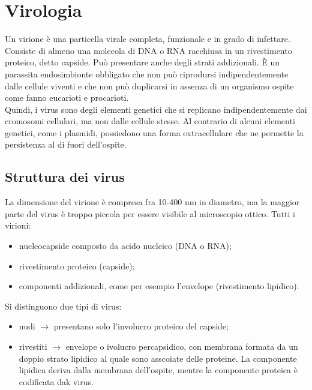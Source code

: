 \chapter{Virologia}
Un virione \`e una particella virale completa, funzionale e in grado di infettare. Consiste di almeno una molecola di DNA o RNA racchiusa in un rivestimento proteico, detto capside. Pu\`o presentare anche degli strati addizionali. \`E un parassita endosimbionte obbligato che non pu\`o riprodursi indipendentemente dalle cellule viventi e che non pu\`o duplicarsi in assenza di un organismo ospite come fanno eucarioti e procarioti. 
\\Quindi, i virus sono degli elementi genetici che si replicano indipendentemente dai cromosomi cellulari, ma non dalle cellule stesse. Al contrario di alcuni elementi genetici, come i plasmidi, possiedono una forma extracellulare che ne permette la persistenza al di fuori dell'ospite.
\section{Struttura dei virus}
La dimensione del virione \`e compresa fra 10-400 nm in diametro, ma la maggior parte del virus \`e troppo piccola per essere visibile al microscopio ottico. Tutti i virioni: 
\begin{itemize}
    \item nucleocapside composto da acido nucleico (DNA o RNA);
    \item rivestimento proteico (capside);
    \item componenti addizionali, come per esempio l'envelope (rivestimento lipidico).
\end{itemize}
Si distinguono due tipi di virus: 
\begin{itemize}
    \item nudi $\xrightarrow{}$ presentano solo l'involucro proteico del capside;
    \item rivestiti $\xrightarrow{}$ envelope o ivolucro percapsidico, con membrana formata da un doppio strato lipidico al quale sono asscoiate delle proteine. La componente lipidica deriva dalla membrana dell'ospite, mentre la componente proteica \`e codificata dak virus.
\end{itemize}
